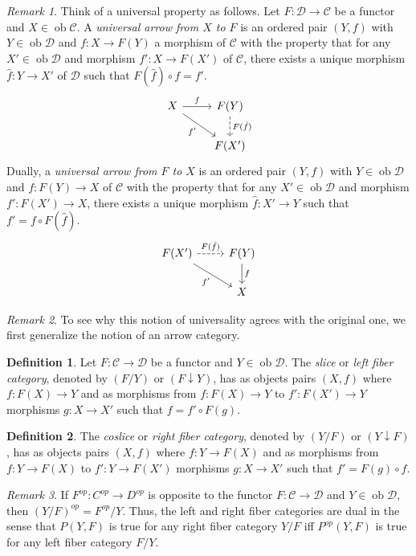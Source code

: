 \documentclass[10pt,letterpaper,cm]{nupset}
\theoremstyle{definition}
\newtheorem{definition}{Definition}
\theoremstyle{theorem}
\theoremstyle{remark}
\newtheorem{remark}{Remark}
\newcommand{\1}{\mathbf{1}}
\renewcommand{\c}{\mathscr{C}}
\renewcommand{\d}{\mathscr{D}}
\newcommand{\0}{\vec 0}
\DeclareMathOperator{\ob}{ob}
\begin{document}
\begin{remark}
Think of a universal property as follows.  Let $F : \d \to \c$ be a functor and $X \in \ob \c$. A \textit{universal arrow from $X$ to $F$} is an ordered pair $(Y, f)$ with $Y \in \ob \d$ and $f : X \to F(Y)$ a morphism of $\c$ with the property that for any $X' \in \ob \d$ and morphism $f' : X \to F(X')$ of $\c$, there exists a unique morphism $\hat{f} : Y \to X'$ of $\d$ such that $F(\hat{f}) \circ f = f'$.
\[ \begin{tikzcd}
X \arrow[r, "f"] \arrow[swap, dr,  " f' "] & F(Y) \arrow[d, dashed, "F(\hat{f})"] \\%
 & F(X')
\end{tikzcd}
\]
Dually, a \textit{universal arrow from $F$ to $X$} is an ordered pair $(Y, f)$ with $Y \in \ob \d$ and $f: F(Y) \to X$ of $\c$ with the property that for any $X' \in \ob \d$ and morphism $f' : F(X') \to X$, there exists a unique morphism $\hat{f}: X' \to Y$ such that $f' = f \circ F(\hat{f})$.
\[ \begin{tikzcd}
F(X') \arrow[r, dashed, "F(\hat{f})"] \arrow[swap, dr,  " f' "] & F(Y) \arrow[d, "f"] \\%
 & X
\end{tikzcd}
\]
\end{remark}

\begin{remark}
To see why this notion of universality agrees with the original one, we first generalize the notion of an arrow category.
\end{remark}

\begin{definition}
Let $F: \c \to \d$ be a functor and $Y \in \ob \d$. The \textit{slice} or \textit{left fiber category}, denoted by $(F/Y)$ or $(F \downarrow Y)$, has as objects pairs $(X, f)$ where $f: F(X) \to Y$ and as morphisms from $f : F(X) \to Y$ to $f' : F(X') \to Y$ morphisms $g : X \to X'$ such that $f = f' \circ F(g).$ 
\end{definition}

\begin{definition}
The \textit{coslice} or \textit{right fiber category}, denoted by $(Y/F)$ or $(Y \downarrow F)$, has as objects pairs $(X, f)$ where $f: Y\to F(X)$ and as morphisms from $f :  Y \to F(X)$ to $f' : Y \to F(X')$ morphisms $g : X \to X'$ such that $f' = F(g) \circ f.$

\end{definition}

\begin{remark}
If $F^{op}:C^{op} \to D^{op}$ is opposite to the functor $F: \c \to \d$ and $Y \in \ob \d$, then $(Y/F)^{op} = {F^{op}}/{Y}$. Thus, the left and right fiber categories are dual in the sense that $P(Y, F)$ is true for any right fiber category ${Y}/{F}$ iff $P^{op}(Y, F)$ is true for any left fiber category ${F}/{Y}$. 
\end{remark}
\end{document}
